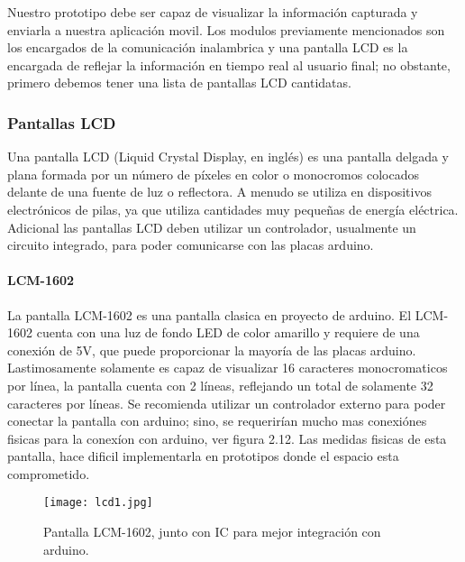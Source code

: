 \par \noindent
Nuestro prototipo debe ser capaz de visualizar la información capturada y enviarla a nuestra aplicación movil. 
Los modulos previamente mencionados son los encargados de la comunicación inalambrica y una pantalla LCD es la encargada de reflejar la información en tiempo real al usuario final; no obstante, primero debemos tener una lista de pantallas LCD cantidatas.

\subsubsection{Pantallas LCD}

Una pantalla LCD (Liquid Crystal Display, en inglés) es una pantalla delgada y plana formada por un número de píxeles en color o monocromos colocados delante de una fuente de luz o reflectora. A menudo se utiliza en dispositivos electrónicos de pilas, ya que utiliza cantidades muy pequeñas de energía eléctrica\cite{lcd}. Adicional las pantallas LCD deben utilizar un controlador, usualmente un circuito integrado, para poder comunicarse con las placas arduino. 

\paragraph{LCM-1602}

La pantalla LCM-1602 es una pantalla clasica en proyecto de arduino. El LCM-1602 cuenta con una luz de fondo LED de color amarillo y requiere de una conexión de 5V, que puede proporcionar la mayoría de las placas arduino. Lastimosamente solamente es capaz de visualizar 16 caracteres monocromaticos por línea, la pantalla cuenta con 2 líneas, reflejando un total de solamente 32 caracteres por líneas\cite{lcm}. Se recomienda utilizar un controlador externo para poder conectar la pantalla con arduino; sino, se requerirían mucho mas conexiónes fisicas para la conexíon con arduino, ver figura 2.12. Las medidas fisicas de esta pantalla, hace dificil implementarla en prototipos donde el espacio esta comprometido.

\begin{figure}[H]
	\centering
	\texttt{[image: lcd1.jpg]}
	\caption{Pantalla LCM-1602, junto con IC para mejor integración con arduino.}
\end{figure}

